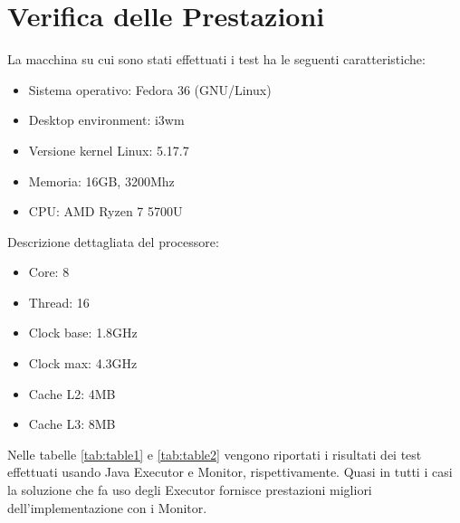 \documentclass[12pt,a4paper,openright,twoside]{book}
\begin{document}
\chapter{Verifica delle Prestazioni} %
\label{chap:Verifica delle Prestazioni}
La macchina su cui sono stati effettuati i test ha le seguenti caratteristiche:
\begin{itemize}
	\item Sistema operativo: Fedora 36 (GNU/Linux)
	\item Desktop environment: i3wm
	\item Versione kernel Linux: 5.17.7
	\item Memoria: 16GB, 3200Mhz
	\item CPU: AMD Ryzen 7 5700U
\end{itemize}
Descrizione dettagliata del processore:
\begin{itemize}
	\item Core: 8
	\item Thread: 16
	\item Clock base: 1.8GHz
	\item Clock max: 4.3GHz
	\item Cache L2: 4MB
	\item Cache L3: 8MB
\end{itemize}

Nelle tabelle \ref{tab:table1} e \ref{tab:table2} vengono riportati i risultati dei test effettuati usando Java Executor e Monitor, rispettivamente.
Quasi in tutti i casi la soluzione che fa uso degli Executor fornisce prestazioni migliori dell'implementazione con i Monitor.
\end{document}
